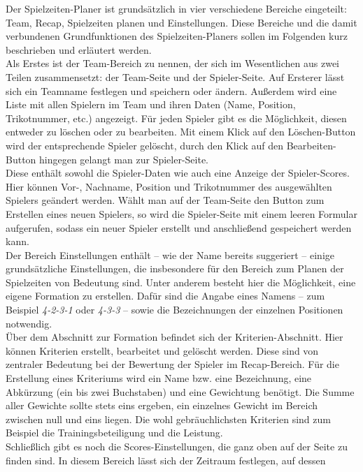
Der Spielzeiten-Planer ist grundsätzlich in vier verschiedene Bereiche eingeteilt: 
Team, Recap, Spielzeiten planen und Einstellungen. Diese Bereiche und die damit 
verbundenen Grundfunktionen des Spielzeiten-Planers sollen im Folgenden kurz 
beschrieben und erläutert werden. \\ 
Als Erstes ist der Team-Bereich zu nennen, der sich im Wesentlichen aus zwei Teilen 
zusammensetzt: der Team-Seite und der Spieler-Seite. Auf Ersterer lässt sich ein 
Teamname festlegen und speichern oder ändern. Außerdem wird eine Liste mit allen 
Spielern im Team und ihren Daten (Name, Position, Trikotnummer, etc.) angezeigt. 
Für jeden Spieler gibt es die Möglichkeit, diesen entweder zu löschen oder zu 
bearbeiten. Mit einem Klick auf den Löschen-Button wird der entsprechende Spieler 
gelöscht, durch den Klick auf den Bearbeiten-Button hingegen gelangt man zur 
Spieler-Seite. \\ 
Diese enthält sowohl die Spieler-Daten wie auch eine Anzeige der Spieler-Scores. 
Hier können Vor-, Nachname, Position und Trikotnummer des ausgewählten Spielers 
geändert werden. Wählt man auf der Team-Seite den Button zum Erstellen eines neuen 
Spielers, so wird die Spieler-Seite mit einem leeren Formular aufgerufen, sodass 
ein neuer Spieler erstellt und anschließend gespeichert werden kann. \\ 
Der Bereich Einstellungen enthält -- wie der Name bereits suggeriert -- einige 
grundsätzliche Einstellungen, die insbesondere für den Bereich zum Planen der 
Spielzeiten von Bedeutung sind. Unter anderem besteht hier die Möglichkeit, eine 
eigene Formation zu erstellen. Dafür sind die Angabe eines Namens -- zum Beispiel 
\textit{4-2-3-1} oder \textit{4-3-3} -- sowie die Bezeichnungen der einzelnen 
Positionen notwendig. \\ 
Über dem Abschnitt zur Formation befindet sich der Kriterien-Abschnitt. Hier können 
Kriterien erstellt, bearbeitet und gelöscht werden. Diese sind von zentraler 
Bedeutung bei der Bewertung der Spieler im Recap-Bereich. Für die Erstellung eines 
Kriteriums wird ein Name bzw. eine Bezeichnung, eine Abkürzung (ein bis zwei 
Buchstaben) und eine Gewichtung benötigt. Die Summe aller Gewichte sollte stets 
eins ergeben, ein einzelnes Gewicht im Bereich zwischen null und eins liegen. 
Die wohl gebräuchlichsten Kriterien sind zum Beispiel die Trainingsbeteiligung und 
die Leistung. \\ 
Schließlich gibt es noch die Scores-Einstellungen, die ganz oben auf der Seite 
zu finden sind. In diesem Bereich lässt sich der Zeitraum festlegen, auf dessen 
